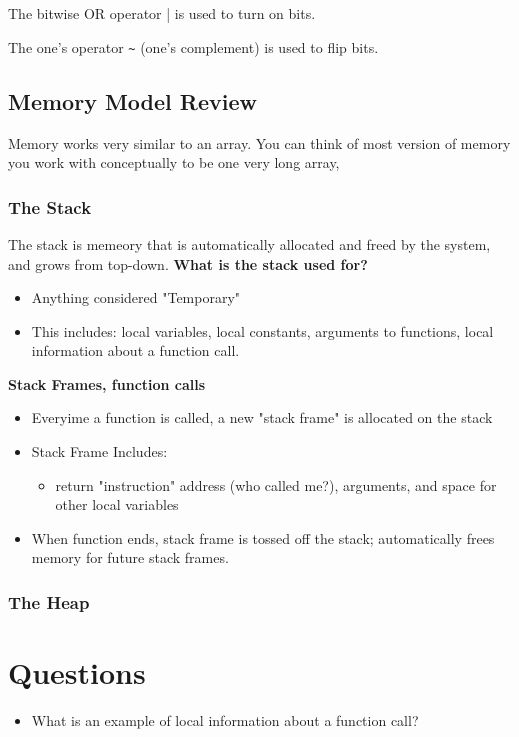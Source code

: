 \documentclass[12pt]{article}
\begin{document}
The bitwise OR operator \lstinline||| is used to turn on bits.

The one's operator \lstinline|~| (one's complement) is used to flip bits.



\subsection{Memory Model Review}
Memory works very similar to an array. You can think of most version of memory you work with conceptually to be one very long array,

\subsubsection{The Stack}
The stack is memeory that is automatically allocated and freed by the system, and grows from top-down.
\textbf{What is the stack used for?}
\begin{itemize}
    \item Anything considered "Temporary"
    \item This includes: local variables, local constants, arguments to functions, local information about a function call.
\end{itemize}

\textbf{Stack Frames, function calls}
\begin{itemize}
    \item Everyime a function is called, a new "stack frame" is allocated on the stack
    \item Stack Frame Includes:
          \begin{itemize}
              \item return "instruction" address (who called me?), arguments, and space for other local variables
          \end{itemize}
    \item When function ends, stack frame is tossed off the stack; automatically frees memory for future stack frames.
\end{itemize}


\subsubsection{The Heap}





\section*{Questions}
\begin{itemize}
    \item What is an example of local information about a function call?
\end{itemize}
\end{document}
